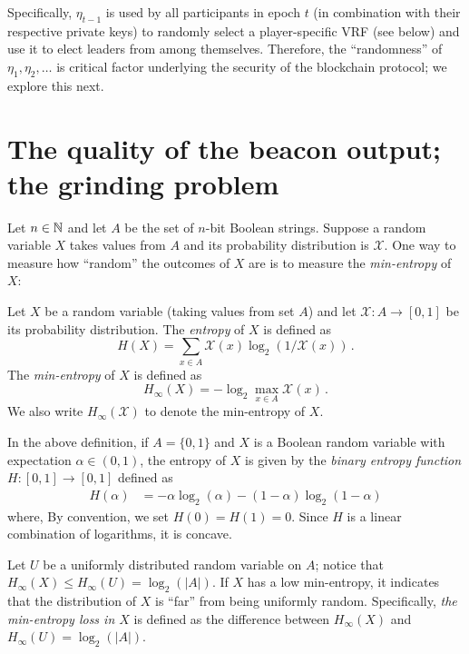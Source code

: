 Specifically, $\eta_{t-1}$ is used by all participants in epoch $t$ 
(in combination with their respective private keys) 
to randomly select a player-specific VRF (see below) 
and use it to elect leaders from among themselves.
Therefore, the ``randomness''
of $\eta_1, \eta_2, \ldots$ is critical factor underlying 
the security of the blockchain protocol; 
we explore this next.

\section{The quality of the beacon output; the grinding problem}

Let $n \in \mathbb{N}$ and let $A$ be the set of $n$-bit Boolean strings.
Suppose a random variable $X$ takes values from $A$
and its probability distribution is $\mathcal{X}$. 
One way to measure how ``random'' the outcomes of $X$ are 
is to measure the \emph{min-entropy} of $X$:

\begin{definition}
    Let $X$ be a random variable (taking values from set $A$) 
    and let $\mathcal{X} : A \rightarrow [0,1]$ be its probability distribution.
    The \emph{entropy} of $X$ is defined as 
    \begin{equation}\label{def:entropy}
        H(X) = \sum_{x \in A} \mathcal{X}(x) \log_2 (1/\mathcal{X}(x))
        \,.
    \end{equation}
    The \emph{min-entropy} of $X$ is defined as 
    \begin{equation}\label{def:min-entropy}
        H_\infty(X) = - \log_2 \max_{x \in A} \mathcal{X}(x)
        \,.
    \end{equation}
    We also write $H_\infty(\mathcal{X})$ to denote the min-entropy of $X$.
\end{definition}
\noindent

In the above definition, 
if $A = \{0,1\}$ and $X$ is a Boolean random variable with expectation $\alpha \in (0,1)$, 
the entropy of $X$ is given by 
the \emph{binary entropy function} $H: [0,1] \rightarrow [0,1]$ defined as 
\begin{align}\label{eq:binary-entropy}
    H(\alpha) &= -\alpha \log_2(\alpha) - (1-\alpha) \log_2(1-\alpha)
\end{align}
where, By convention, we set $H(0) = H(1) = 0$. 
Since $H$ is a linear combination of logarithms, it is concave. 

Let $U$ be a uniformly distributed random variable on $A$; 
notice that $H_\infty(X) \leq H_\infty(U) = \log_2(|A|)$. 
If $X$ has a low min-entropy, 
it indicates that the distribution of $X$ is ``far'' from being uniformly random. 
Specifically, \emph{the min-entropy loss in $X$} 
is defined as the difference between $H_\infty(X)$ and $H_\infty(U) = \log_2(|A|)$.


